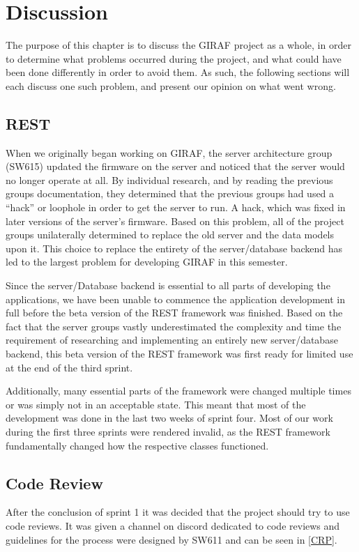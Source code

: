 \chapter{Discussion}
The purpose of this chapter is to discuss the GIRAF project as a whole, in order
to determine what problems occurred during the project, and what could have been
done differently in order to avoid them. As such, the following sections will
each discuss one such problem, and present our opinion on what went wrong.

\section{REST}
When we originally began working on GIRAF, the server
architecture group (SW615) updated the firmware on the server and noticed that
the server would no longer operate at all. By individual research, and by
reading the previous groups documentation, they determined that the previous
groups had used a ``hack'' or loophole in order to get the server to run. A
hack, which was fixed in later versions of the server's firmware. Based on this
problem, all of the project groups unilaterally determined to replace the old
server and the data models upon it. This choice to replace the entirety of
the server/database backend has led to the largest problem for developing GIRAF
in this semester.\nl

Since the server/Database backend is essential to all parts of developing the
applications, we have been unable to commence the application development in
full before the beta version of the REST framework was finished. Based on the
fact that the server groups vastly underestimated the complexity and time
the requirement of researching and implementing an entirely new server/database
backend, this beta version of the REST framework was first ready for limited use
at the end of the third sprint.\nl

Additionally, many essential parts of the
framework were changed multiple times or was simply not in an acceptable state. This meant that
most of the development was done in the last two weeks of sprint four. Most of
our work during the first three sprints were rendered invalid, as the REST
framework fundamentally changed how the respective classes functioned.

\section{Code Review}
After the conclusion of sprint 1 it was decided that the project should try to
use code reviews. It was given a channel on discord dedicated to code reviews
and guidelines for the process were designed by SW611 and can be seen in
\autoref{CRP}.\nl

